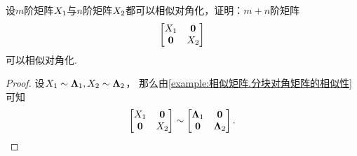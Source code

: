 \begin{example}
设\(m\)阶矩阵\(X_1\)与\(n\)阶矩阵\(X_2\)都可以相似对角化，证明：\(m+n\)阶矩阵\[
	\begin{bmatrix} X_1 & \boldsymbol0 \\ \boldsymbol0 & X_2 \end{bmatrix}
\]可以相似对角化.
\begin{proof}
设\(X_1 \sim \boldsymbol\Lambda_1,
X_2 \sim \boldsymbol\Lambda_2\)，
那么由\cref{example:相似矩阵.分块对角矩阵的相似性} 可知\begin{equation*}
	\begin{bmatrix}
		X_1 & \boldsymbol0 \\
		\boldsymbol0 & X_2
	\end{bmatrix}
	\sim \begin{bmatrix}
		\boldsymbol\Lambda_1 & \boldsymbol0 \\
		\boldsymbol0 & \boldsymbol\Lambda_2
	\end{bmatrix}.
	\qedhere
\end{equation*}
\end{proof}
\end{example}

